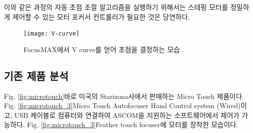 이와 같은 과정의 자동 초점 조절 알고리즘을 실행하기 위해서는 스테핑 모터를 정밀하게 제어할 수 있는 모터 포커서 컨트롤러가 필요한 것은 당연하다. 

\begin{figure}[h]
	\begin{center}
		\texttt{[image: V-curve]}
	\end{center}
	\caption{FocusMAX에서 V curve를 얻어 초점을 결정하는 모습 \cite{weber2001fast}.}
	\label{fig:V-curve}
\end{figure}

\clearpage

\subsection{기존 제품 분석}

Fig. \ref{fig:microtouch}\가 바로 미국의 Starizona사에서 판매하는 Micro Touch  제품이다. Fig. \ref{fig:microtouch_3}\가 Micro Touch Autofocuser Hand Control system (Wired)이고, USB 케이블로 컴퓨터와 연결하여 ASCOM을 지원하는 소프트웨어에서 제어가 가능하다.  Fig. \ref{fig:microtouch_3}\는 Feather touch focuser에 모터를 장착한 모습이다. 


